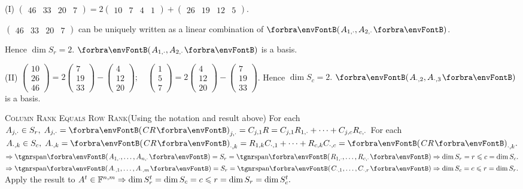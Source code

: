 (I) {\normalsize$\begin{pmatrix} 46 & 33 & 20 & 7 \end{pmatrix}=2\begin{pmatrix} 10 & 7 & 4 & 1\end{pmatrix}+\begin{pmatrix} 26 & 19 & 12 & 5\end{pmatrix}$}.\vspace{3pt}\par\quad\HI
{\small$\begin{pmatrix} 46 & 33 & 20 & 7 \end{pmatrix}$} can be uniquely written as a linear combination of $\Par{A_{1,\cdot},A_{2,\cdot}}$.\vspace{3pt}\par\quad\HI
Hence $\dim S_r=2$. $\Par{A_{1,\cdot},A_{2,\cdot}}$ is a basis.\par\vspace{6pt}\quad\EndI
(II) {\normalsize$\begin{pmatrix} 10\\ 26\\ 46\end{pmatrix}=2\begin{pmatrix} 7\\ 19\\ 33\end{pmatrix}-\begin{pmatrix} 4\\ 12\\ 20\end{pmatrix}; \quad \begin{pmatrix} 1\\ 5\\ 7\end{pmatrix}=2\begin{pmatrix} 4\\ 12\\ 20\end{pmatrix}-\begin{pmatrix} 7\\ 19\\ 33\end{pmatrix}$}. \;Hence $\dim S_c=2.$ $\Par{A_{\cdot,2},A_{\cdot,3}}$ is a basis.\vspace{6pt}\par
\SepLine
\pagebreak

\BulletPointX\textsc{Column Rank Equals Row Rank}\quad (Using the notation and result above)\TextB{}
For each $A_{j,\cdot}\in S_r,\;A_{j,\cdot}=\Par{CR}_{j,\cdot}=C_{j,1}R=C_{j,1}R_{1,\cdot}+\dots+C_{j,c}R_{c,\cdot}$\TextB{}
For each $A_{\cdot,k}\in S_c,\;A_{\cdot,k}=\Par{CR}_{\cdot,k}=R_{1,k}C_{\cdot,1}+\dots+R_{c,k}C_{\cdot,c}=\Par{CR}_{\cdot,k}.$\TextB{}
$\Rightarrow\Span{A_{1,\cdot},\dots,A_{n,\cdot}}=S_r=\Span{R_{1,\cdot},\dots,R_{c,\cdot}}\Rightarrow\dim S_r=r\leqslant c=\dim S_c.$\TextB{}
$\Rightarrow\Span{A_{\cdot,1},\dots,A_{\cdot,m}}=S_r=\Span{C_{\cdot,1},\dots,C_{\cdot,r}}\Rightarrow\dim S_c=c\leqslant r=\dim S_r.$\TextB{}
\Or Apply the result to $A^t\in{\mathbb{F}}^{n,m}\Rightarrow\dim S_r^t=\dim S_c=c\leqslant r=\dim S_r=\dim S_c^t.$\PfEnd
\SepLine[10pt]

